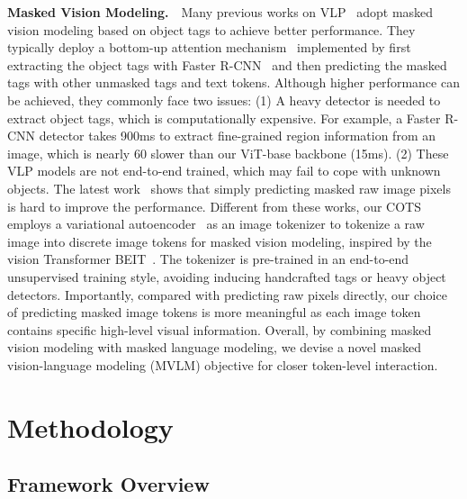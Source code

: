 \documentclass[10pt,twocolumn,letterpaper]{article}
\begin{document}
\noindent\textbf{Masked Vision Modeling.}~~Many previous works on VLP~\cite{chen2020uniter, li2020oscar} adopt masked vision modeling based on object tags to achieve better performance. They typically deploy a bottom-up attention mechanism~\cite{anderson2018bottom} implemented by first extracting the object tags with Faster R-CNN~\cite{ren2015faster} and then predicting the masked tags with other unmasked tags and text tokens. Although higher performance can be achieved, they commonly face two issues: (1) A heavy detector is needed to extract object tags, which is computationally expensive. For example, a Faster R-CNN detector takes 900ms to extract fine-grained region information from an image, which is nearly 60 slower than our ViT-base backbone (15ms). (2) These VLP models are not end-to-end trained, which may fail to cope with unknown objects.
The latest work~\cite{kim2021vilt} shows that simply predicting masked raw image pixels is hard to improve the performance. Different from these works, our COTS employs a variational autoencoder~\cite{kingma2013auto} as an image tokenizer to tokenize a raw image into discrete image tokens for masked vision modeling, inspired by the vision Transformer BEIT~\cite{bao2021beit}. The tokenizer is pre-trained in an end-to-end unsupervised training style, avoiding inducing handcrafted tags or heavy object detectors. Importantly, compared with predicting raw pixels directly, our choice of predicting masked image tokens is more meaningful as each image token contains specific high-level visual information. Overall, by combining masked vision modeling with masked language modeling, we devise a novel masked vision-language modeling (MVLM) objective for closer token-level interaction.


\section{Methodology}

\subsection{Framework Overview}
\end{document}
